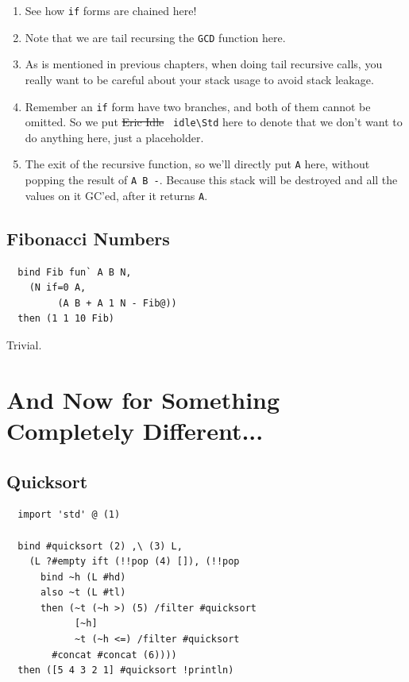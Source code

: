 \documentclass{report}
\newcommand{\mstd}[1]{\texttt{#1\textbackslash Std}}
\newcommand{\mtilde}[1]{\textasciitilde}
\begin{document}
\begin{enumerate}
\item See how \texttt{if} forms are chained here!
\item Note that we are tail recursing the \texttt{GCD} function here.
\item As is mentioned in previous chapters, when doing tail recursive calls, you really want to be careful about your stack usage to avoid stack leakage.
\item Remember an \texttt{if} form have two branches, and both of them cannot be omitted. So we put \sout{Eric Idle} \mstd{\mtilde ~idle} here to denote that we don't want to do anything here, just a placeholder.
\item The exit of the recursive function, so we'll directly put \texttt{A} here, without popping the result of \texttt{A B -}. Because this stack will be destroyed and all the values on it GC'ed, after it returns \texttt{A}.
\end{enumerate}

\subsection{Fibonacci Numbers}
\begin{mdframed}[style=example]
\begin{verbatim}
  bind Fib fun` A B N,
    (N if=0 A,
         (A B + A 1 N - Fib@))
  then (1 1 10 Fib)
\end{verbatim}
\end{mdframed}
Trivial.

\section{And Now for Something Completely Different...}

\subsection{Quicksort}
\begin{mdframed}[style=example]
\begin{verbatim}
  import 'std' @ (1)

  bind #quicksort (2) ,\ (3) L,
    (L ?#empty ift (!!pop (4) []), (!!pop
      bind ~h (L #hd)
      also ~t (L #tl)
      then (~t (~h >) (5) /filter #quicksort
            [~h]
            ~t (~h <=) /filter #quicksort
        #concat #concat (6))))
  then ([5 4 3 2 1] #quicksort !println)
\end{verbatim}
\end{mdframed}
\end{document}
